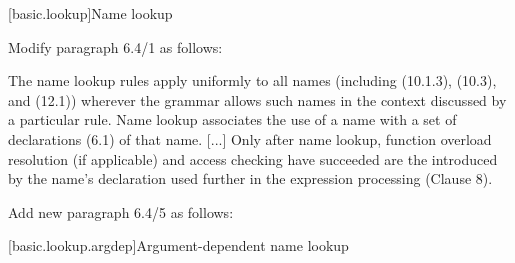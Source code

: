 \setcounter{section}{3}
[basic.lookup]{Name lookup}

Modify paragraph 6.4/1 as follows:
\begin{std.txt}
  \resetalinea[0]
  \alinea
  The name lookup rules apply uniformly to all names
  (including  (10.1.3),
   (10.3), and 
   (12.1))
  wherever the grammar allows such names in the context discussed by a 
  particular rule.
  Name lookup associates the use of a name with a set of declarations (6.1)
   of that name.
  [...] Only after name lookup, function overload resolution (if applicable)
  and access checking have succeeded are the
   introduced by the name's
  declaration used further in the expression processing (Clause 8).

\end{std.txt}

Add new paragraph 6.4/5 as follows:
\begin{std.txt}\color{addclr}
  \resetalinea[4]
  \alinea
\end{std.txt}

\setcounter{subsection}{1}
[basic.lookup.argdep]{Argument-dependent name lookup}

